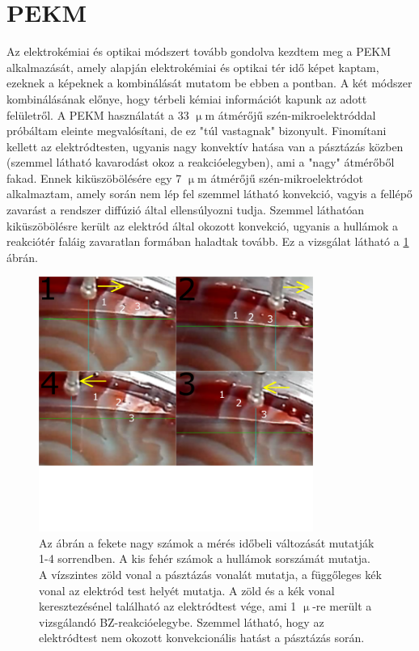 \section{PEKM}
Az elektrokémiai és optikai módszert tovább gondolva kezdtem meg a PEKM alkalmazását, amely alapján elektrokémiai és optikai tér idő képet kaptam, ezeknek a képeknek a kombinálását mutatom be ebben a pontban. A két módszer kombinálásának előnye, hogy térbeli kémiai információt kapunk az adott felületről.
A PEKM használatát a 33 $\upmu$m átmérőjű szén-mikroelektróddal próbáltam eleinte megvalósítani, de ez "túl vastagnak" bizonyult. Finomítani kellett az elektródtesten, ugyanis nagy konvektív hatása van a pásztázás közben (szemmel látható kavarodást okoz a reakcióelegyben), ami a "nagy" átmérőből fakad. Ennek kiküszöbölésére egy 7 $\upmu$m átmérőjű szén-mikroelektródot alkalmaztam, amely során nem lép fel szemmel látható konvekció, vagyis a fellépő zavarást a rendszer diffúzió által ellensúlyozni tudja. Szemmel láthatóan kiküszöbölésre került az elektród által okozott konvekció, ugyanis a hullámok a reakciótér faláig zavaratlan formában haladtak tovább. Ez a  vizsgálat látható a \ref{fig:secmkep} ábrán.
\begin{figure}[h]
\centering
\includegraphics[width=0.8\textwidth]{img/secmkep.png}
\caption{Az ábrán a fekete nagy számok a mérés időbeli változását mutatják 1-4 sorrendben. A kis fehér számok a hullámok sorszámát mutatja. A vízszintes zöld vonal a pásztázás vonalát mutatja, a függőleges kék vonal az elektród test helyét mutatja. A zöld és a kék vonal keresztezésénel található az elektródtest vége, ami 1 $\upmu$-re merült a vizsgálandó BZ-reakcióelegybe. Szemmel látható, hogy az elektródtest nem okozott konvekcionális hatást a pásztázás során.}
\label{fig:secmkep}
\end{figure}

